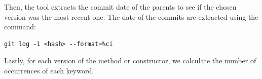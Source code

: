 Then, the tool extracts the commit date of the parents to see if the chosen version was the most recent one. The date of the commits are extracted using the command:
\lstset{language=Bash,numbers=left,xleftmargin=2em,frame=single,framexleftmargin=1.5em}
\begin{lstlisting}[frame=single]
git log -1 <hash> --format=%ci
\end{lstlisting}

Lastly, for each version of the method or constructor, we calculate the number of occurrences of each keyword.







